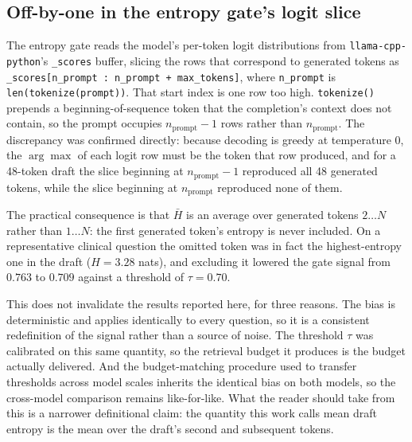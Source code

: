 %

\subsection{Off-by-one in the entropy gate's logit slice}
\label{sec:limitation-entropy-offset}

The entropy gate reads the model's per-token logit distributions from
\texttt{llama-cpp-python}'s \texttt{\_scores} buffer, slicing the rows that
correspond to generated tokens as
\texttt{\_scores[n\_prompt : n\_prompt + max\_tokens]}, where
\texttt{n\_prompt} is \texttt{len(tokenize(prompt))}. That start index is one
row too high. \texttt{tokenize()} prepends a beginning-of-sequence token that
the completion's context does not contain, so the prompt occupies
$n_{\text{prompt}} - 1$ rows rather than $n_{\text{prompt}}$. The discrepancy
was confirmed directly: because decoding is greedy at temperature $0$, the
$\arg\max$ of each logit row must be the token that row produced, and for a
48-token draft the slice beginning at $n_{\text{prompt}} - 1$ reproduced all 48
generated tokens, while the slice beginning at $n_{\text{prompt}}$ reproduced
none of them.

The practical consequence is that $\bar{H}$ is an average over generated tokens
$2 \ldots N$ rather than $1 \ldots N$: the first generated token's entropy is
never included. On a representative clinical question the omitted token was in
fact the highest-entropy one in the draft ($H = 3.28$ nats), and excluding it
lowered the gate signal from $0.763$ to $0.709$ against a threshold of
$\tau = 0.70$.

This does not invalidate the results reported here, for three reasons. The bias
is deterministic and applies identically to every question, so it is a
consistent redefinition of the signal rather than a source of noise. The
threshold $\tau$ was calibrated on this same quantity, so the retrieval budget
it produces is the budget actually delivered. And the budget-matching procedure
used to transfer thresholds across model scales inherits the identical bias on
both models, so the cross-model comparison remains like-for-like. What the
reader should take from this is a narrower definitional claim: the quantity
this work calls mean draft entropy is the mean over the draft's second and
subsequent tokens.

